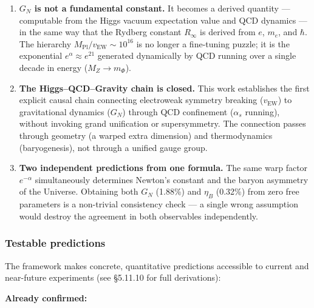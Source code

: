 \documentclass[
  11pt,
]{article}
\begin{document}
\begin{enumerate}
\def\labelenumi{\arabic{enumi}.}
\item
  \textbf{\(G_N\) is not a fundamental constant.} It becomes a derived
  quantity --- computable from the Higgs vacuum expectation value and
  QCD dynamics --- in the same way that the Rydberg constant
  \(R_\infty\) is derived from \(e\), \(m_e\), and \(\hbar\). The
  hierarchy \(M_{\text{Pl}} / v_{\text{EW}} \sim 10^{16}\) is no longer
  a fine-tuning puzzle; it is the exponential
  \(e^{\alpha} \approx e^{21}\) generated dynamically by QCD running
  over a single decade in energy (\(M_Z \to m_\Phi\)).
\item
  \textbf{The Higgs--QCD--Gravity chain is closed.} This work
  establishes the first explicit causal chain connecting electroweak
  symmetry breaking (\(v_{\text{EW}}\)) to gravitational dynamics
  (\(G_N\)) through QCD confinement (\(\alpha_s\) running), without
  invoking grand unification or supersymmetry. The connection passes
  through geometry (a warped extra dimension) and thermodynamics
  (baryogenesis), not through a unified gauge group.
\item
  \textbf{Two independent predictions from one formula.} The same warp
  factor \(e^{-\alpha}\) simultaneously determines Newton's constant and
  the baryon asymmetry of the Universe. Obtaining both \(G_N\) (1.88\%)
  and \(\eta_B\) (0.32\%) from zero free parameters is a non-trivial
  consistency check --- a single wrong assumption would destroy the
  agreement in both observables independently.
\end{enumerate}

\hypertarget{testable-predictions}{%
\subsubsection{Testable predictions}\label{testable-predictions}}

The framework makes concrete, quantitative predictions accessible to
current and near-future experiments (see §5.11.10 for full derivations):

\textbf{Already confirmed:}
\end{document}
